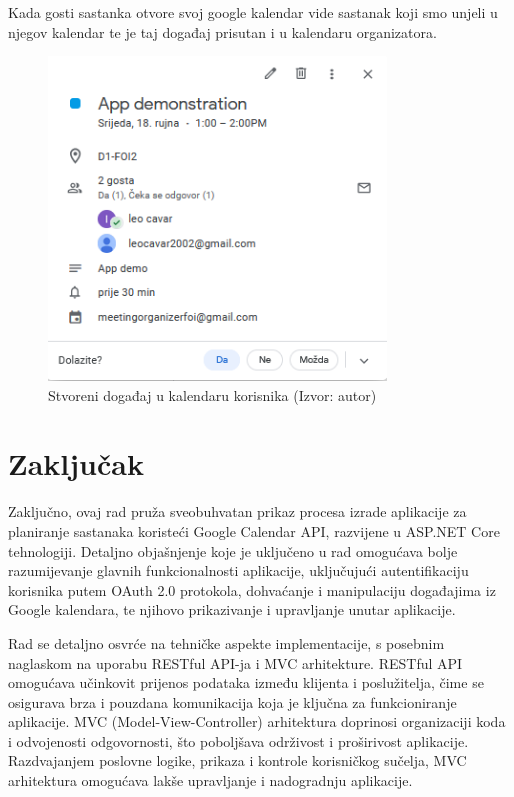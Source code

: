 \documentclass{foi}
\begin{document}
Kada gosti sastanka otvore svoj google kalendar vide sastanak koji smo unjeli u njegov kalendar te je taj događaj prisutan i u kalendaru organizatora.
\begin{figure}[H]
    \centering
    \includegraphics[width=0.8\textwidth]{slike/appUsage7.png}
    \caption{Stvoreni događaj u kalendaru korisnika (Izvor: autor)}
    \label{fig:GCUserUI}
\end{figure}

\chapter{Zaključak}

Zaključno, ovaj rad pruža sveobuhvatan prikaz procesa izrade aplikacije za planiranje sastanaka koristeći Google Calendar API, razvijene u ASP.NET Core tehnologiji. Detaljno objašnjenje koje je uključeno u rad omogućava bolje razumijevanje glavnih funkcionalnosti aplikacije, uključujući autentifikaciju korisnika putem OAuth 2.0 protokola, dohvaćanje i manipulaciju događajima iz Google kalendara, te njihovo prikazivanje i upravljanje unutar aplikacije.

Rad se detaljno osvrće na tehničke aspekte implementacije, s posebnim naglaskom na uporabu RESTful API-ja i MVC arhitekture. RESTful API omogućava učinkovit prijenos podataka između klijenta i poslužitelja, čime se osigurava brza i pouzdana komunikacija koja je ključna za funkcioniranje aplikacije. MVC (Model-View-Controller) arhitektura doprinosi organizaciji koda i odvojenosti odgovornosti, što poboljšava održivost i proširivost aplikacije. Razdvajanjem poslovne logike, prikaza i kontrole korisničkog sučelja, MVC arhitektura omogućava lakše upravljanje i nadogradnju aplikacije.
\end{document}
